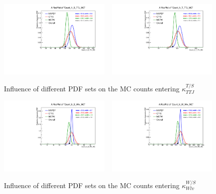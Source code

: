 \begin{figure}[htpb]
\centering
\includegraphics[width=0.48\textwidth,clip=true,trim=0 0.2cm 0 1.2cm]
{figures/razor_systematics/h_S_TTJ_MC}
~
\includegraphics[width=0.48\textwidth,clip=true,trim=0 0.2cm 0 1.2cm]
{figures/razor_systematics/h_T_TTJ_MC}
\caption{Influence of different PDF sets on the MC counts entering $\kappa_{TTJ}^{T/S}$
\label{fig:PDF_effect_on_bg_TTJ}}
\end{figure}

\begin{figure}[htpb]
\centering
\includegraphics[width=0.48\textwidth,clip=true,trim=0 0.2cm 0 1.2cm]
{figures/razor_systematics/h_S_Wlv_MC}
~
\includegraphics[width=0.48\textwidth,clip=true,trim=0 0.2cm 0 1.2cm]
{figures/razor_systematics/h_W_Wlv_MC}
\caption{Influence of different PDF sets on the MC counts entering $\kappa_{Wlv}^{W/S}$
\label{fig:PDF_effect_on_bg_Wlv}}
\end{figure}


